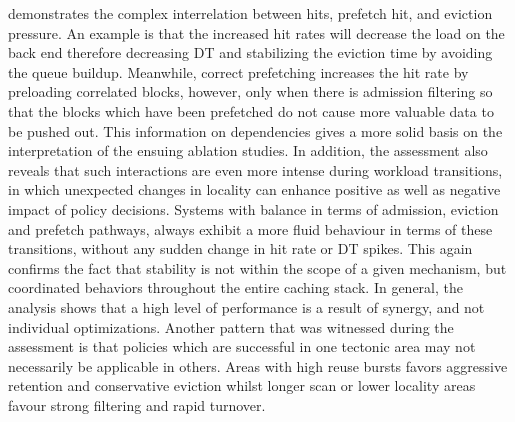 \documentclass[sigconf]{acmart}
\begin{document}
{demonstrates the complex interrelation between hits, prefetch hit, and eviction pressure. An example is that the increased hit rates will decrease the load on the back end therefore decreasing DT and stabilizing the eviction time by avoiding the queue buildup. Meanwhile, correct prefetching increases the hit rate by preloading correlated blocks, however, only when there is admission filtering so that the blocks which have been prefetched do not cause more valuable data to be pushed out. This information on dependencies gives a more solid basis on the interpretation of the ensuing ablation studies. In addition, the assessment also reveals that such interactions are even more intense during workload transitions, in which unexpected changes in locality can enhance positive as well as negative impact of policy decisions. Systems with balance in terms of admission, eviction and prefetch pathways, always exhibit a more fluid behaviour in terms of these transitions, without any sudden change in hit rate or DT spikes. This again confirms the fact that stability is not within the scope of a given mechanism, but coordinated behaviors throughout the entire caching stack. In general, the analysis shows that a high level of performance is a result of synergy, and not individual optimizations. Another pattern that was witnessed during the assessment is that policies which are successful in one tectonic area may not necessarily be applicable in others. Areas with high reuse bursts favors aggressive retention and conservative eviction whilst longer scan or lower locality areas favour strong filtering and rapid turnover.

\clearpage
}
\end{document}
